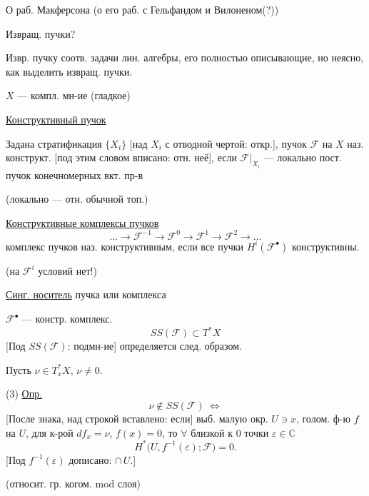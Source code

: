 О раб. Макферсона (о его раб. с Гельфандом и Вилоненом(?))

Извращ. пучки?

Извр. пучку соотв. задачи лин. алгебры, его полностью описывающие,
но неясно, как выделить извращ. пучки.



$X$ — компл. мн-ие (гладкое)

\underline{Конструктивный пучок}

Задана стратификация $\{X_i\}$ [над $X_i$ с отводной чертой: откр.],
пучок $\mathcal{F}$ на $X$ наз. конструкт.
[под этим словом вписано: отн. неё],
если $\mathcal{F}|_{X_i}$ — локально пост. пучок конечномерных вкт. пр-в

(локально — отн. обычной топ.)

\underline{Конструктивные комплексы пучков}
\begin{equation*}
\ldots\longrightarrow\mathcal{F}^{-1}
\longrightarrow\mathcal{F}^{0}
\longrightarrow\mathcal{F}^{1}
\longrightarrow\mathcal{F}^{2}\longrightarrow\ldots \tag{1}
\end{equation*}
комплекс пучков наз. конструктивным, если все пучки
$H^{i}(\mathcal{F}^{\bullet})$ конструктивны.

(на $\mathcal{F}^{i}$ условий нет!)

\underline{Синг. носитель} пучка или комплекса

$\mathcal{F}^{\bullet}$ — констр. комплекс.
\begin{equation*}
SS(\mathcal{F})\subset T^{*}X \tag{2}
\end{equation*}
[Под $SS(\mathcal{F})$: подмн-ие]
определяется след. образом.

Пусть $\nu\in T_x^{*}X$, $\nu\ne0$.

(3) \underline{Опр.}
\begin{equation*}
\nu\notin SS(\mathcal{F})\ \Longleftrightarrow
\end{equation*}
[После знака, над строкой вставлено: если]
выб. малую окр. $U\ni x$, голом. ф-ю $f$ на $U$,
для к-рой $df_x=\nu$, $f(x)=0$, то $\forall$ близкой к $0$
точки $\varepsilon\in\mathbb{C}$
\begin{equation*}
H^{*}\bigl(U,f^{-1}(\varepsilon);\mathcal{F}\bigr)=0. \tag{4}
\end{equation*}
[Под $f^{-1}(\varepsilon)$ дописано: $\cap\,U$.]

(относит. гр. когом. mod слоя)

